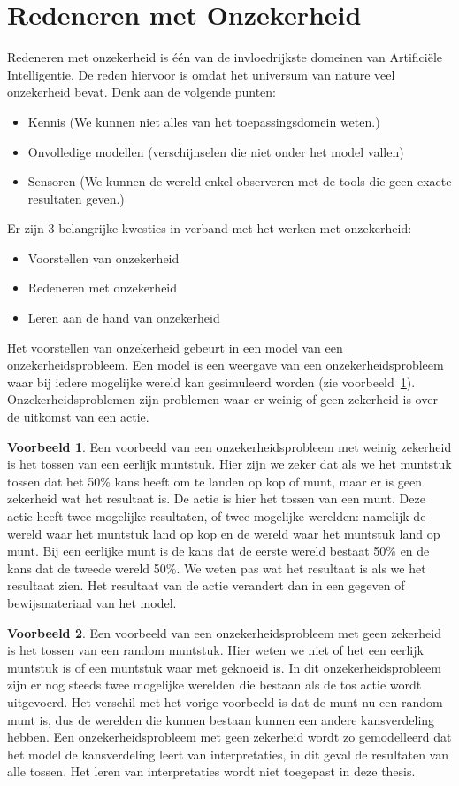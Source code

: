 \documentclass[12pt,a4paper,oneside]{book}
\theoremstyle{definition}
\newtheorem{exmp}{Voorbeeld}[section]
\begin{document}
\section{Redeneren met Onzekerheid}
Redeneren met onzekerheid is \'{e}\'{e}n van de invloedrijkste domeinen van Artifici\"{e}le Intelligentie. De reden hiervoor is omdat het universum van nature veel onzekerheid bevat. Denk aan de volgende punten:
\begin{itemize}
	\item Kennis (We kunnen niet alles van het toepassingsdomein weten.)
	\item Onvolledige modellen (verschijnselen die niet onder het model vallen)
	\item Sensoren (We kunnen de wereld enkel observeren met de tools die geen exacte resultaten geven.)
\end{itemize}
Er zijn 3 belangrijke kwesties in verband met het werken met onzekerheid:
\begin{itemize}
	\item Voorstellen van onzekerheid
	\item Redeneren met onzekerheid
	\item Leren aan de hand van onzekerheid
\end{itemize}
Het voorstellen van onzekerheid gebeurt in een model van een onzekerheidsprobleem. Een model is een weergave van een onzekerheidsprobleem waar bij iedere mogelijke wereld kan gesimuleerd worden (zie voorbeeld~\ref{exmp:faircoin}). Onzekerheidsproblemen zijn problemen waar er weinig of geen zekerheid is over de uitkomst van een actie.
\begin{exmp}
\label{exmp:faircoin}
Een voorbeeld van een onzekerheidsprobleem met weinig zekerheid is het tossen van een eerlijk muntstuk. Hier zijn we zeker dat als we het muntstuk tossen dat het 50\% kans heeft om te landen op kop of munt, maar er is geen zekerheid wat het resultaat is. De actie is hier het tossen van een munt. Deze actie heeft twee mogelijke resultaten, of twee mogelijke werelden: namelijk de wereld waar het muntstuk land op kop en de wereld waar het muntstuk land op munt. Bij een eerlijke munt is de kans dat de eerste wereld bestaat 50\% en de kans dat de tweede wereld 50\%. We weten pas wat het resultaat is als we het resultaat zien. Het resultaat van de actie verandert dan in een gegeven of bewijsmateriaal van het model.
\end{exmp}
\begin{exmp}
Een voorbeeld van een onzekerheidsprobleem met geen zekerheid is het tossen van een random muntstuk. Hier weten we niet of het een eerlijk muntstuk is of een muntstuk waar met geknoeid is. In dit onzekerheidsprobleem zijn er nog steeds twee mogelijke werelden die bestaan als de tos actie wordt uitgevoerd. Het verschil met het vorige voorbeeld is dat de munt nu een random munt is, dus de werelden die kunnen bestaan kunnen een andere kansverdeling hebben. Een onzekerheidsprobleem met geen zekerheid wordt zo gemodelleerd dat het model de kansverdeling leert van interpretaties, in dit geval de resultaten van alle tossen. Het leren van interpretaties wordt niet toegepast in deze thesis.
\end{exmp}
\end{document}
